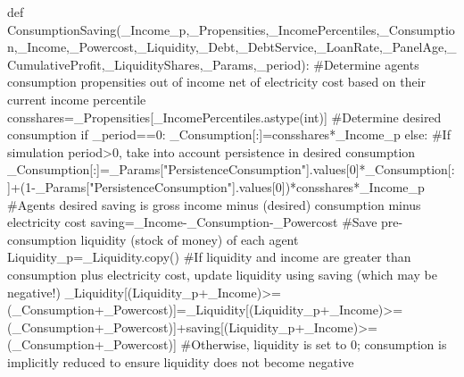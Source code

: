 \documentclass[
  letterpaper,
  DIV=11,
  numbers=noendperiod]{scrartcl}
\newenvironment{Shaded}{\begin{snugshade}}{\end{snugshade}}
\newcommand{\BuiltInTok}[1]{\textcolor[rgb]{0.00,0.23,0.31}{#1}}
\newcommand{\CommentTok}[1]{\textcolor[rgb]{0.37,0.37,0.37}{#1}}
\newcommand{\ControlFlowTok}[1]{\textcolor[rgb]{0.00,0.23,0.31}{#1}}
\newcommand{\DecValTok}[1]{\textcolor[rgb]{0.68,0.00,0.00}{#1}}
\newcommand{\KeywordTok}[1]{\textcolor[rgb]{0.00,0.23,0.31}{#1}}
\newcommand{\NormalTok}[1]{\textcolor[rgb]{0.00,0.23,0.31}{#1}}
\newcommand{\OperatorTok}[1]{\textcolor[rgb]{0.37,0.37,0.37}{#1}}
\newcommand{\StringTok}[1]{\textcolor[rgb]{0.13,0.47,0.30}{#1}}
\begin{document}
\begin{Shaded}
\begin{Highlighting}[]
\KeywordTok{def}\NormalTok{ ConsumptionSaving(\_Income\_p,\_Propensities,\_IncomePercentiles,\_Consumption,\_Income,\_Powercost,\_Liquidity,\_Debt,\_DebtService,\_LoanRate,\_PanelAge,\_CumulativeProfit,\_LiquidityShares,\_Params,\_period):}
    \CommentTok{\#Determine agents\textquotesingle{} consumption propensities out of income net of electricity cost based on their current income percentile}
\NormalTok{    consshares}\OperatorTok{=}\NormalTok{\_Propensities[\_IncomePercentiles.astype(}\BuiltInTok{int}\NormalTok{)]}
    \CommentTok{\#Determine desired consumption}
    \ControlFlowTok{if}\NormalTok{ \_period}\OperatorTok{==}\DecValTok{0}\NormalTok{:}
\NormalTok{        \_Consumption[:]}\OperatorTok{=}\NormalTok{consshares}\OperatorTok{*}\NormalTok{\_Income\_p}
    \ControlFlowTok{else}\NormalTok{:}
        \CommentTok{\#If simulation period\textgreater{}0, take into account persistence in desired consumption}
\NormalTok{        \_Consumption[:]}\OperatorTok{=}\NormalTok{\_Params[}\StringTok{"PersistenceConsumption"}\NormalTok{].values[}\DecValTok{0}\NormalTok{]}\OperatorTok{*}\NormalTok{\_Consumption[:]}\OperatorTok{+}\NormalTok{(}\DecValTok{1}\OperatorTok{{-}}\NormalTok{\_Params[}\StringTok{"PersistenceConsumption"}\NormalTok{].values[}\DecValTok{0}\NormalTok{])}\OperatorTok{*}\NormalTok{consshares}\OperatorTok{*}\NormalTok{\_Income\_p}
    \CommentTok{\#Agents\textquotesingle{} desired saving is gross income minus (desired) consumption minus electricity cost}
\NormalTok{    saving}\OperatorTok{=}\NormalTok{\_Income}\OperatorTok{{-}}\NormalTok{\_Consumption}\OperatorTok{{-}}\NormalTok{\_Powercost}
    \CommentTok{\#Save pre{-}consumption liquidity (stock of money) of each agent}
\NormalTok{    Liquidity\_p}\OperatorTok{=}\NormalTok{\_Liquidity.copy()}
    \CommentTok{\#If liquidity and income are greater than consumption plus electricity cost, update liquidity using saving (which may be negative!)}
\NormalTok{    \_Liquidity[(Liquidity\_p}\OperatorTok{+}\NormalTok{\_Income)}\OperatorTok{\textgreater{}=}\NormalTok{(\_Consumption}\OperatorTok{+}\NormalTok{\_Powercost)]}\OperatorTok{=}\NormalTok{\_Liquidity[(Liquidity\_p}\OperatorTok{+}\NormalTok{\_Income)}\OperatorTok{\textgreater{}=}\NormalTok{(\_Consumption}\OperatorTok{+}\NormalTok{\_Powercost)]}\OperatorTok{+}\NormalTok{saving[(Liquidity\_p}\OperatorTok{+}\NormalTok{\_Income)}\OperatorTok{\textgreater{}=}\NormalTok{(\_Consumption}\OperatorTok{+}\NormalTok{\_Powercost)]}
    \CommentTok{\#Otherwise, liquidity is set to 0; consumption is implicitly reduced to ensure liquidity does not become negative}

\end{Highlighting}
\end{Shaded}
\end{document}
